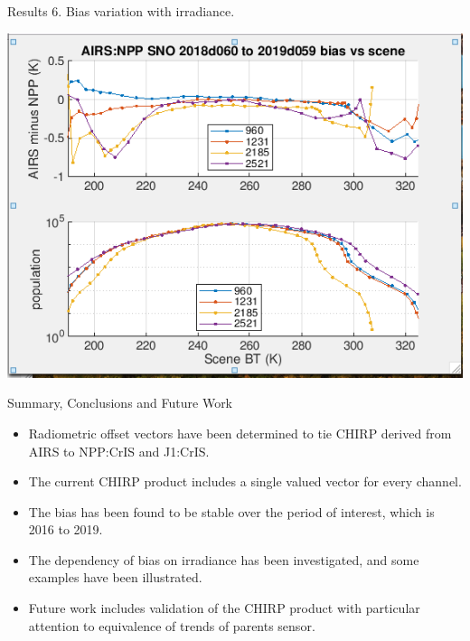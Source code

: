 \documentclass[10pt,t]{beamer}
\begin{document}
\begin{frame}{Results 6. Bias variation with irradiance.}

  \begin{center}
    \includegraphics[width=0.6\linewidth]{./Figs/plot1.png}
  \end{center}

  
\end{frame}

%
%    
%
\begin{frame}{Summary, Conclusions and Future Work}

  \begin{itemize}
  \item Radiometric offset vectors have been determined to tie CHIRP derived from AIRS to NPP:CrIS and J1:CrIS.
  \item The current CHIRP product includes a single valued vector for every channel.
  \item The bias has been found to be stable over the period of interest, which is 2016 to 2019.
  \item The dependency of bias on irradiance has been investigated, and some examples have been illustrated.
  \item Future work includes validation of the CHIRP product with particular attention to equivalence of trends of parents sensor.
    
  \end{itemize}
  

\end{frame}
\end{document}
